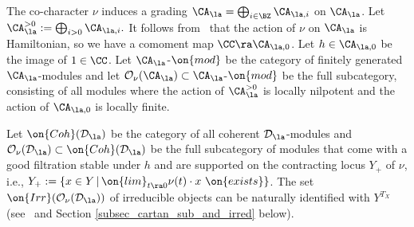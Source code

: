 \documentclass[12pt]{amsart}
\newcommand{\CO}{\mathcal{O}}
\begin{document}
	The co-character $\nu$ induces a grading $\CA_{\la}=\bigoplus_{i\in \BZ}\CA_{\la,i}$ on $\CA_\la$.
	Let 
	$
	\CA^{>0}_{\la}:=\bigoplus_{i> 0}\CA_{\la,i}.
	$
	It follows from~\cite[Proposition~3.11]{BPW} that the action of $\nu$ 
	on $\CA_\la$ is Hamiltonian, so we have a comoment map $\CC \ra \CA_{\la,0}$. Let $h \in \CA_{\la,0}$ be the image of $1 \in \CC$.
	Let $\CA_\la$-$\on{mod}$ be the category of finitely generated $\CA_\la$-modules and let $\CO_{\nu}(\CA_\la) \subset \CA_\la$-$\on{mod}$ be the full subcategory, consisting of all modules where the action of $\CA^{>0}_\la$ is locally nilpotent and the action of $\CA_{\la,0}$ is locally finite.
	
	Let $\on{Coh}(\mathcal{D}_\la)$ be the category of all coherent $\mathcal{D}_\la$-modules and $\CO_\nu(\mathcal{D}_\la) \subset \on{Coh}(\mathcal{D}_\la)$ be the  full subcategory of modules that come with a good filtration stable under $h$ and  are supported on the contracting locus 
	$Y_+$ of $\nu$, i.e., $Y_+:=\{x\in Y\,|\,\on{lim}_{t\ra 0}\nu(t)\cdot x~\on{exists}\}$.
 The set
	$\on{Irr}(\CO_\nu(\mathcal{D}_\la))$ of irreducible objects
	can be naturally identified with $Y^{T_X}$ (see~\cite[Proposition~5.17]{BPWII} and Section \ref{subsec_cartan_sub_and_irred} below). 
\end{document}
